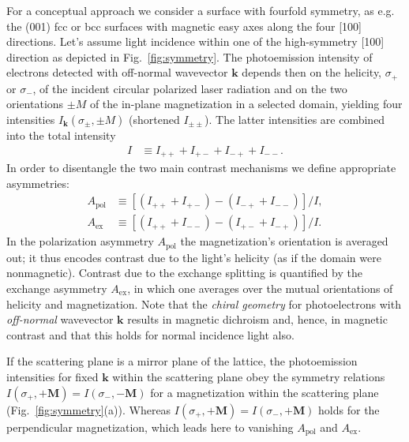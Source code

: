 \documentclass[prl,twocolumn,floatfix]{revtex4-2}
\renewcommand{\vec}[1]{\boldsymbol{#1}}
\begin{document}
For a conceptual approach we consider a surface with fourfold symmetry, as e.g. the (001) fcc or bcc surfaces with magnetic easy axes along the four [100] directions. Let's assume light incidence within one of the high-symmetry [100] direction as depicted in Fig.~\ref{fig:symmetry}. The photoemission intensity of electrons detected with off-normal wavevector $\vec{k}$ depends then on the helicity, $\sigma_{+}$ or $\sigma_{-}$, of the incident circular polarized laser radiation and on the two orientations $\pm M$ of the in-plane magnetization in a selected domain, yielding four intensities $I_{\vec{k}}(\sigma_{\pm}, \pm M)$ (shortened $I_{\pm \pm}$). The latter intensities are combined into the total intensity
\begin{align}
    I & \equiv I_{+ +} + I_{+ -} + I_{- +} + I_{- -}. 
\end{align}
In order to disentangle the two main contrast mechanisms we define appropriate asymmetries:
\begin{subequations}
\begin{align}
    A_{\mathrm{pol}} & \equiv \left[ \left( I_{+ +} + I_{+ -} \right) - \left( I_{- +} + I_{- -} \right) \right] / I,
    \label{eq:Apol}
    \\
    A_{\mathrm{ex}} & \equiv \left[ \left( I_{+ +} + I_{- -} \right) - \left( I_{+ -} + I_{- +} \right) \right] / I.
    \label{eq:Aex}
\end{align}    
\end{subequations}
In the polarization asymmetry $A_{\mathrm{pol}}$ the magnetization's orientation is averaged out; it thus encodes contrast due to the light's helicity (as if the domain were nonmagnetic). Contrast due to the exchange splitting is quantified by the exchange asymmetry $A_{\mathrm{ex}}$, in which one averages over the mutual orientations of helicity and magnetization. Note that the \textit{chiral geometry} for photoelectrons with \textit{off-normal} wavevector $\vec{k}$ results in magnetic dichroism and, hence, in magnetic contrast and that this holds for normal incidence light also.

If the scattering plane is a mirror plane of the lattice, the photoemission intensities for fixed $\vec{k}$ within the scattering plane obey the symmetry relations $I(\sigma_{+}, +\vec{M}) = I(\sigma_{-}, -\vec{M})$ for a magnetization within the scattering plane (Fig.~\ref{fig:symmetry}(a)). Whereas $I(\sigma_{+}, +\vec{M}) = I(\sigma_{-}, +\vec{M})$ holds for the perpendicular magnetization, which leads here to vanishing $A_{\mathrm{pol}}$ and $A_{\mathrm{ex}}$.
\end{document}
